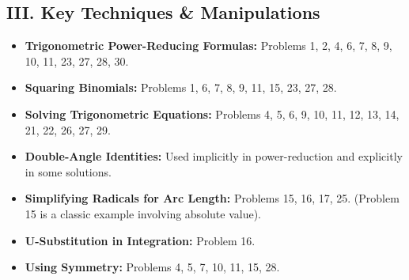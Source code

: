 \documentclass{article}
\begin{document}
\subsection*{III. Key Techniques \& Manipulations}
\begin{itemize}
    \item \textbf{Trigonometric Power-Reducing Formulas:} Problems 1, 2, 4, 6, 7, 8, 9, 10, 11, 23, 27, 28, 30.
    \item \textbf{Squaring Binomials:} Problems 1, 6, 7, 8, 9, 11, 15, 23, 27, 28.
    \item \textbf{Solving Trigonometric Equations:} Problems 4, 5, 6, 9, 10, 11, 12, 13, 14, 21, 22, 26, 27, 29.
    \item \textbf{Double-Angle Identities:} Used implicitly in power-reduction and explicitly in some solutions.
    \item \textbf{Simplifying Radicals for Arc Length:} Problems 15, 16, 17, 25. (Problem 15 is a classic example involving absolute value).
    \item \textbf{U-Substitution in Integration:} Problem 16.
    \item \textbf{Using Symmetry:} Problems 4, 5, 7, 10, 11, 15, 28.
\end{itemize}
\end{document}
